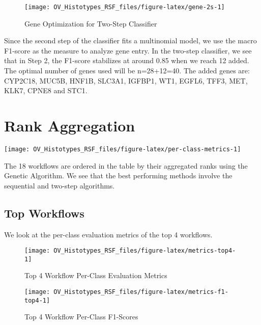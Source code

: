 \documentclass[
]{report}
\begin{document}
\begin{figure}[H]

{\centering \texttt{[image: OV\_Histotypes\_RSF\_files/figure-latex/gene-2s-1]} 

}

\caption{Gene Optimization for Two-Step Classifier}\label{fig:gene-2s}
\end{figure}

Since the second step of the classifier fits a multinomial model, we use the macro F1-score as the measure to analyze gene entry. In the two-step classifier, we see that in Step 2, the F1-score stabilizes at around 0.85 when we reach 12 added. The optimal number of genes used will be n=28+12=40. The added genes are: CYP2C18, MUC5B, HNF1B, SLC3A1, IGFBP1, WT1, EGFL6, TFF3, MET, KLK7, CPNE8 and STC1.

\hypertarget{rank-aggregation}{%
\section{Rank Aggregation}\label{rank-aggregation}}

\begin{center}\texttt{[image: OV\_Histotypes\_RSF\_files/figure-latex/per-class-metrics-1]} \end{center}

The 18 workflows are ordered in the table by their aggregated ranks using the Genetic Algorithm. We see that the best performing methods involve the sequential and two-step algorithms.

\hypertarget{top-workflows}{%
\subsection{Top Workflows}\label{top-workflows}}

We look at the per-class evaluation metrics of the top 4 workflows.

\begin{figure}[H]

{\centering \texttt{[image: OV\_Histotypes\_RSF\_files/figure-latex/metrics-top4-1]} 

}

\caption{Top 4 Workflow Per-Class Evaluation Metrics}\label{fig:metrics-top4}
\end{figure}

\begin{figure}[H]

{\centering \texttt{[image: OV\_Histotypes\_RSF\_files/figure-latex/metrics-f1-top4-1]} 

}

\caption{Top 4 Workflow Per-Class F1-Scores}\label{fig:metrics-f1-top4}
\end{figure}
\end{document}
